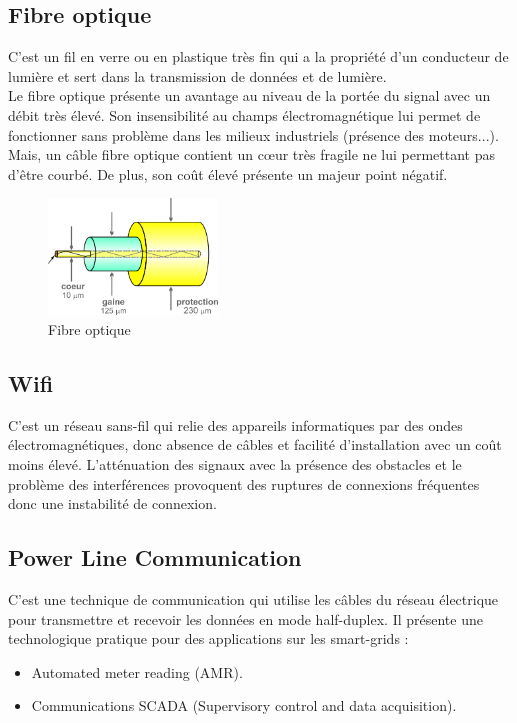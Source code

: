 \documentclass[11pt, a4paper, twoside]{book}
\begin{document}
\subsection{Fibre optique}
C'est un fil en verre ou en plastique très fin qui a la propriété d'un conducteur de lumière et sert dans la transmission de données et de lumière.\\

Le fibre optique présente un avantage au niveau de la portée du signal avec un débit très élevé. Son insensibilité au champs électromagnétique lui permet de fonctionner sans problème dans les milieux industriels (présence des moteurs...). Mais, un câble fibre optique contient un cœur très fragile ne lui permettant pas d'être courbé. De plus, son coût élevé présente un majeur point négatif.
\begin{figure}[H]
\centering
\includegraphics[width=0.4\textwidth]{opticalFibre}
\caption{Fibre optique}
\end{figure}
\subsection{Wifi}
C'est un réseau sans-fil qui relie des appareils informatiques par des ondes électromagnétiques, donc absence de câbles et facilité d'installation avec un coût moins élevé. L'atténuation des signaux avec la présence des obstacles et le problème des interférences provoquent des ruptures de connexions fréquentes donc une instabilité de connexion.
\subsection{Power Line Communication}
C'est une technique de communication qui utilise les câbles du réseau électrique pour transmettre et recevoir les données en mode half-duplex. Il présente une technologique pratique pour des applications sur les smart-grids :
\begin{itemize}
\item Automated meter reading (AMR).
\item Communications SCADA (Supervisory control and data acquisition).
\end{itemize}
\end{document}
